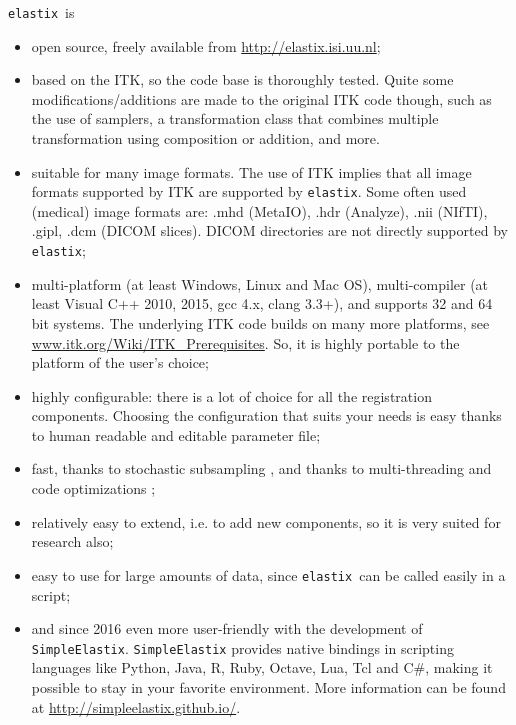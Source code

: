 \documentclass[]{report}
\newcommand{\elastix}{\texttt{elastix}}
\begin{document}
\elastix\ is
\begin{itemize}
\item open source, freely available from \url{http://elastix.isi.uu.nl};

\item based on the ITK, so the code base is thoroughly tested.
Quite some modifications/additions are made to the original ITK
code though, such as the use of samplers, a transformation class
that combines multiple transformation using composition or
addition, and more.

\item suitable for many image formats. The use of ITK implies that all
    image formats supported by ITK are supported by \elastix. Some often
    used (medical) image formats are: .mhd (MetaIO), .hdr (Analyze), .nii
    (NIfTI), .gipl, .dcm (DICOM slices). DICOM directories are not directly
    supported by \elastix;

\item multi-platform (at least Windows, Linux and Mac OS), multi-compiler
    (at least Visual C++ 2010, 2015, gcc 4.x, clang 3.3+), and supports
    32 and 64 bit systems. The underlying ITK code builds on many more
    platforms, see \url{www.itk.org/Wiki/ITK_Prerequisites}. So, it is
    highly portable to the platform of the user's choice;

\item highly configurable: there is a lot of choice for all the registration
components. Choosing the configuration that suits your needs is easy
thanks to human readable and editable parameter file;

\item fast, thanks to stochastic subsampling \cite{KleinEA07}, and thanks to
multi-threading and code optimizations \cite{Shamonin2014};

\item relatively easy to extend, i.e. to add new components, so it is
very suited for research also;

\item easy to use for large amounts of data, since \elastix\ can be
called easily in a script;

\item and since 2016 even more user-friendly with the development of
\texttt{SimpleElastix}. \texttt{SimpleElastix} provides native
bindings in scripting languages like Python, Java, R, Ruby, Octave,
Lua, Tcl and C\#, making it possible to stay in your favorite
environment. More information can be found at
\url{http://simpleelastix.github.io/}.

\end{itemize}
\end{document}
